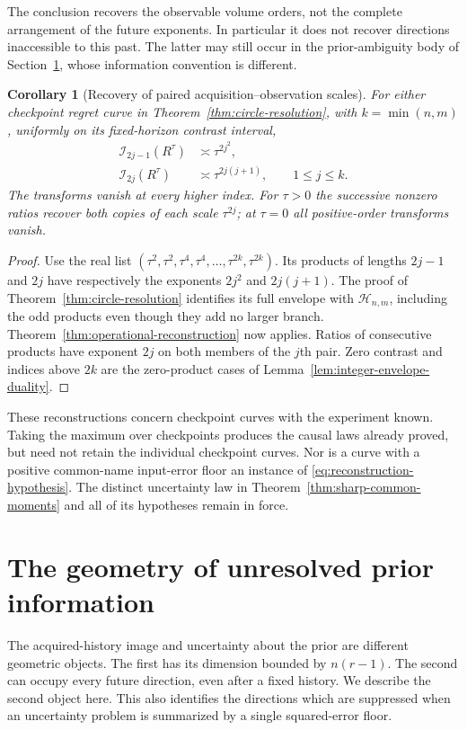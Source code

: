 \documentclass[11pt]{amsart}
\newtheorem{corollary}[theorem]{Corollary}
\theoremstyle{definition}\newtheorem{definition}[theorem]{Definition}
\theoremstyle{remark}\newtheorem{remark}[theorem]{Remark}
\begin{document}
The conclusion recovers the observable volume orders, not the complete
arrangement of the future exponents. In particular it does not recover
directions inaccessible to this past. The latter may still occur in the
prior-ambiguity body of Section~\ref{sec:directional-geometry}, whose
information convention is different.

\begin{corollary}[Recovery of paired acquisition--observation scales]
\label{cor:circular-operational-recovery}
For either checkpoint regret curve in
Theorem~\ref{thm:circle-resolution}, with $k=\min(n,m)$, uniformly on
its fixed-horizon contrast interval,
\begin{equation}\label{eq:circle-operational-recovery}
 \begin{split}
 \mathcal I_{2j-1}(R^\tau)&\asymp\tau^{2j^2},\\
 \mathcal I_{2j}(R^\tau)&\asymp\tau^{2j(j+1)},
             \qquad 1\le j\le k.
 \end{split}
\end{equation}
The transforms vanish at every higher index. For $\tau>0$ the
successive nonzero ratios recover both copies of each scale
$\tau^{2j}$; at $\tau=0$ all positive-order transforms vanish.
\end{corollary}
\begin{proof}
Use the real list
$(\tau^2,\tau^2,\tau^4,\tau^4,\ldots,\tau^{2k},\tau^{2k})$.
Its products of lengths $2j-1$ and $2j$ have respectively the exponents
$2j^2$ and $2j(j+1)$. The proof of
Theorem~\ref{thm:circle-resolution} identifies its full envelope with
$\mathcal H_{n,m}$, including the odd products even though they add no
larger branch. Theorem~\ref{thm:operational-reconstruction} now applies.
Ratios of consecutive products have exponent $2j$ on both members of
the $j$th pair. Zero contrast and indices above $2k$ are the zero-product
cases of Lemma~\ref{lem:integer-envelope-duality}.
\end{proof}

These reconstructions concern checkpoint curves with the experiment
known. Taking the maximum over checkpoints produces the causal laws
already proved, but need not retain the individual checkpoint curves.
Nor is a curve with a positive common-name input-error floor an instance
of \eqref{eq:reconstruction-hypothesis}. The distinct uncertainty law in
Theorem~\ref{thm:sharp-common-moments} and all of its hypotheses remain
in force.

\section{The geometry of unresolved prior information}
\label{sec:directional-geometry}
The acquired-history image and uncertainty about the prior are different
geometric objects. The first has its dimension bounded by $n(r-1)$.
The second can occupy every future direction, even after a fixed history.
We describe the second object here. This also identifies the directions
which are suppressed when an uncertainty problem is summarized by a
single squared-error floor.
\end{document}
